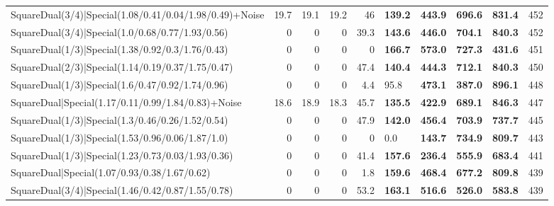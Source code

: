 \begin{tabular}{lrrrrllllr}
 SquareDual(3/4)|Special(1.08/0.41/0.04/1.98/0.49)+Noise &         19.7 &         19.1 &         19.2 &            46   & \textbf{139.2} & \textbf{443.9} & \textbf{696.6} & \textbf{831.4}  &          452 \\
 SquareDual(3/4)|Special(1.0/0.68/0.77/1.93/0.56)        &          0   &          0   &          0   &            39.3 & \textbf{143.6} & \textbf{446.0} & \textbf{704.1} & \textbf{840.3}  &          452 \\
 SquareDual(1/3)|Special(1.38/0.92/0.3/1.76/0.43)        &          0   &          0   &          0   &             0   & \textbf{166.7} & \textbf{573.0} & \textbf{727.3} & \textbf{431.6}  &          451 \\
 SquareDual(2/3)|Special(1.14/0.19/0.37/1.75/0.47)       &          0   &          0   &          0   &            47.4 & \textbf{140.4} & \textbf{444.3} & \textbf{712.1} & \textbf{840.3}  &          450 \\
 SquareDual(1/3)|Special(1.6/0.47/0.92/1.74/0.96)        &          0   &          0   &          0   &             4.4 & 95.8           & \textbf{473.1} & \textbf{387.0} & \textbf{896.1}  &          448 \\
 SquareDual|Special(1.17/0.11/0.99/1.84/0.83)+Noise      &         18.6 &         18.9 &         18.3 &            45.7 & \textbf{135.5} & \textbf{422.9} & \textbf{689.1} & \textbf{846.3}  &          447 \\
 SquareDual(1/3)|Special(1.3/0.46/0.26/1.52/0.54)        &          0   &          0   &          0   &            47.9 & \textbf{142.0} & \textbf{456.4} & \textbf{703.9} & \textbf{737.7}  &          445 \\
 SquareDual(1/3)|Special(1.53/0.96/0.06/1.87/1.0)        &          0   &          0   &          0   &             0   & 0.0            & \textbf{143.7} & \textbf{734.9} & \textbf{809.7}  &          443 \\
 SquareDual(1/3)|Special(1.23/0.73/0.03/1.93/0.36)       &          0   &          0   &          0   &            41.4 & \textbf{157.6} & \textbf{236.4} & \textbf{555.9} & \textbf{683.4}  &          441 \\
 SquareDual|Special(1.07/0.93/0.38/1.67/0.62)            &          0   &          0   &          0   &             1.8 & \textbf{159.6} & \textbf{468.4} & \textbf{677.2} & \textbf{809.8}  &          439 \\
 SquareDual(3/4)|Special(1.46/0.42/0.87/1.55/0.78)       &          0   &          0   &          0   &            53.2 & \textbf{163.1} & \textbf{516.6} & \textbf{526.0} & \textbf{583.8}  &          439 \\

\end{tabular}
